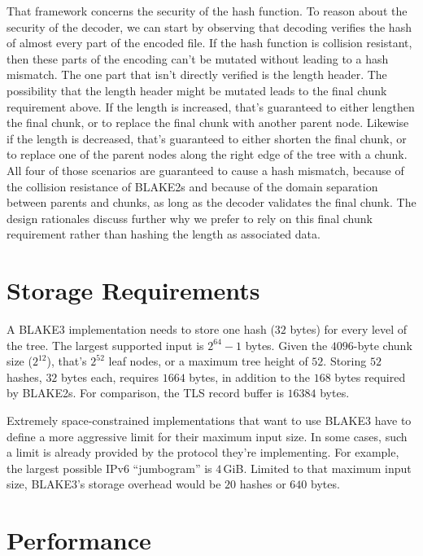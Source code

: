 \documentclass[11pt,notitlepage,a4paper]{article}
\newcommand{\name}{BLAKE3\xspace}
\begin{document}
That framework concerns the security of the hash function. To reason about the security of the decoder, we can start by observing that decoding verifies the hash of almost every part of the encoded file. If the hash function is collision resistant, then these parts of the encoding can't be mutated without leading to a hash mismatch. The one part that isn't directly verified is the length header. The possibility that the length header might be mutated leads to the final chunk requirement above. If the length is increased, that's guaranteed to either lengthen the final chunk, or to replace the final chunk with another parent node. Likewise if the length is decreased, that's guaranteed to either shorten the final chunk, or to replace one of the parent nodes along the right edge of the tree with a chunk. All four of those scenarios are guaranteed to cause a hash mismatch, because of the collision resistance of BLAKE2s and because of the domain separation between parents and chunks, as long as the decoder validates the final chunk. The design rationales discuss further why we prefer to rely on this final chunk requirement rather than hashing the length as associated data.

\section{Storage Requirements}\label{sec:storage}

A \name implementation needs to store one hash ($32$ bytes) for every level of the tree. The largest supported input is $2^{64} - 1$ bytes. Given the $4096$-byte chunk size ($2^{12}$), that's $2^{52}$ leaf nodes, or a maximum tree height of $52$. Storing $52$ hashes, $32$ bytes each, requires $1664$ bytes, in addition to the $168$ bytes required by BLAKE2s. For comparison, the TLS record buffer is $16384$ bytes.

Extremely space-constrained implementations that want to use \name have to define a more aggressive limit for their maximum input size. In some cases, such a limit is already provided by the protocol they're implementing. For example, the largest possible IPv6 ``jumbogram'' is $4$\,GiB. Limited to that maximum input size, \name's storage overhead would be $20$ hashes or $640$ bytes.


\section{Performance}\label{sec:performance}
\end{document}
